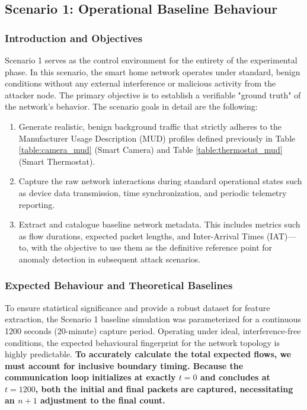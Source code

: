 \subsection{Scenario 1: Operational Baseline Behaviour}
\subsubsection{Introduction and Objectives}
Scenario 1 serves as the control environment for the entirety of the experimental phase. In this scenario, the smart home network operates under standard, benign conditions without any external interference or malicious activity from the attacker node. The primary objective is to establish a verifiable "ground truth" of the network's behavior. The scenario goals in detail are the following:

\begin{enumerate}
	\item Generate realistic, benign background traffic that strictly adheres to the Manufacturer Usage Description (MUD) profiles defined previously in Table \ref{table:camera_mud} (Smart Camera) and Table \ref{table:thermostat_mud} (Smart Thermostat).
	\item Capture the raw network interactions during standard operational states such as device data transmission, time synchronization, and periodic telemetry reporting.
	\item Extract and catalogue baseline network metadata. This includes metrics such as flow durations, expected packet lengths, and Inter-Arrival Times (IAT)—to, with the objective to use them as the definitive reference point for anomaly detection in subsequent attack scenarios.
\end{enumerate}


\subsubsection{Expected Behaviour and Theoretical Baselines}

To ensure statistical significance and provide a robust dataset for feature extraction, the Scenario 1 baseline simulation was parameterized for a continuous 1200 seconds (20-minute) capture period. Operating under ideal, interference-free conditions, the expected behavioural fingerprint for the network topology is highly predictable. \textbf{To accurately calculate the total expected flows, we must account for inclusive boundary timing. Because the communication loop initializes at exactly $t=0$ and concludes at $t=1200$, both the initial and final packets are captured, necessitating an $n+1$ adjustment to the final count.}

